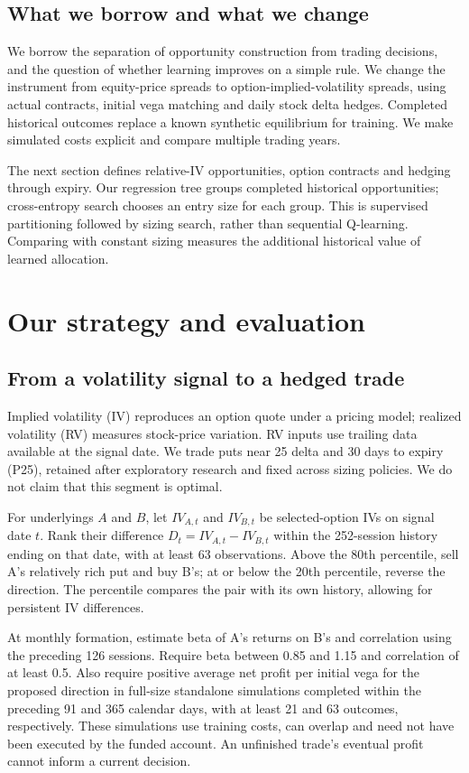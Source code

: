 \documentclass[11pt,letterpaper]{article}
\begin{document}
\subsection*{What we borrow and what we change}
We borrow the separation of opportunity construction from trading decisions,
and the question of whether learning improves on a simple rule. We change the
instrument from equity-price spreads to option-implied-volatility spreads,
using actual contracts, initial vega matching and daily stock delta hedges.
Completed historical outcomes replace a known synthetic equilibrium for
training. We make simulated costs explicit and compare multiple trading years.

The next section defines relative-IV opportunities, option contracts and
hedging through expiry. Our regression tree groups completed historical
opportunities; cross-entropy search chooses an entry size for each group.
This is supervised partitioning followed by sizing search, rather than
sequential Q-learning. Comparing with constant sizing measures the additional
historical value of learned allocation.

\clearpage
\section{Our strategy and evaluation}
\subsection{From a volatility signal to a hedged trade}
Implied volatility (IV) reproduces an option quote under a pricing model;
realized volatility (RV) measures stock-price variation. RV inputs use trailing
data available at the signal date. We trade puts near 25 delta and 30 days to
expiry (P25), retained after exploratory research and fixed across sizing
policies. We do not claim that this segment is optimal.

For underlyings $A$ and $B$, let $IV_{A,t}$ and $IV_{B,t}$ be selected-option
IVs on signal date $t$. Rank their difference $D_t=IV_{A,t}-IV_{B,t}$ within
the 252-session history ending on that date, with at least 63 observations.
Above the 80th percentile, sell A's relatively rich put and buy B's; at or
below the 20th percentile, reverse the direction. The percentile compares
the pair with its own history, allowing for persistent IV differences.

At monthly formation, estimate beta of A's returns on B's and correlation
using the preceding 126 sessions. Require beta between 0.85 and 1.15 and
correlation of at least 0.5. Also require positive average net profit per
initial vega for the proposed direction in full-size standalone simulations
completed within the preceding 91 and 365 calendar days, with at least 21 and
63 outcomes, respectively. These simulations use training costs, can overlap
and need not have been executed by the funded account. An unfinished trade's
eventual profit cannot inform a current decision.
\end{document}
